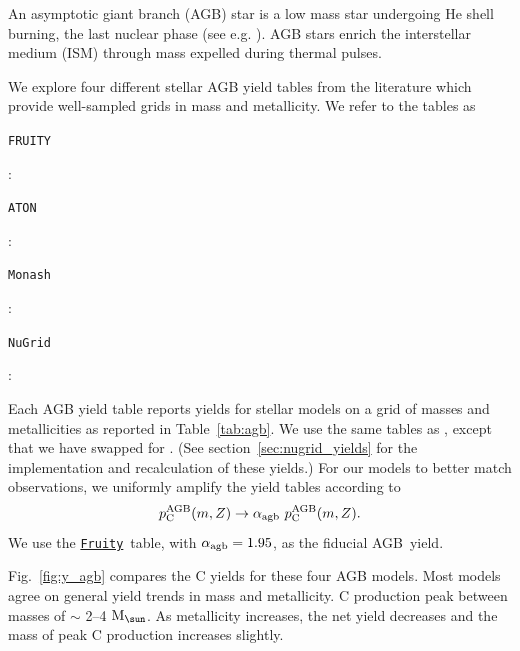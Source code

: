 \documentclass[fleqn,
usenatbib]{mnras}
\newcommand{\fruity}{\texttt{\hyperlink{fruity}{Fruity}}}
\newcommand{\cfactor}{1.95}
\newcommand{\agb}{AGB}
\newcommand{\ycagb}{\y_{\rm C}^{\rm AGB}}
\newcommand{\y}{p}
\newcommand{\Mo}{ {\rm M}_{\sun}}
\begin{document}
An asymptotic giant branch (AGB) star is a low mass star undergoing He shell burning, the last nuclear phase (see e.g. \citealt{PR2023}). AGB stars enrich the interstellar medium (ISM) through mass expelled during thermal pulses. 


We explore four different stellar AGB yield tables from the literature which provide well-sampled grids in mass and metallicity. We refer to the tables as 
\begin{description}
    \item \hypertarget{fruity}{\texttt{FRUITY}}: \citet{cristallo+11, cristallo+15}
    \item \hypertarget{aton}{\texttt{ATON}}: \citet{ventura+13,ventura+14,ventura+18, ventura+20}
    \item \hypertarget{monash}{\texttt{Monash}}: \citet{KL16, karakas+18}
    \item \hypertarget{nugrid}{\texttt{NuGrid}}: \citet{pignatari+16, ritter+18, battino+19, battino+21}
\end{description}
Each AGB yield table reports yields for stellar models on a grid of masses and metallicities as reported in Table~\ref{tab:agb}.
We use the same tables as \citet{james+23}, except that we have swapped \citet{karakas10} for \citet{pignatari+16}. (See section~\ref{sec:nugrid_yields} for the implementation and recalculation of these yields.)
For our models to better match observations, we uniformly amplify the yield tables according to
\begin{equation} \label{eq:alpha}
        \ycagb(m, Z) \rightarrow \alpha_{\rm agb}\ \ycagb(m, Z).
\end{equation}
We use the \fruity\ table, with $\alpha_{\rm agb}=\cfactor$, as the fiducial \agb\ yield.

Fig.~\ref{fig:y_agb} compares the C yields for these four AGB models.
Most models agree on general yield trends in mass and metallicity.
C production peak between masses of $\sim$ 2--4 $\Mo$. As metallicity increases, the net yield decreases and the mass of peak C production increases slightly.
\end{document}
